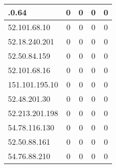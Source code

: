 \documentclass{article}
\begin{document}
\begin{longtable}{|>{\raggedright\arraybackslash}p{3cm}|c|c|c|c|}
    52.18.0.64 & 0 & 0 & 0 & 0 \\
    \hline
    
    
    \rowcolor{lightgreen} %
    
    52.101.68.10 & 0 & 0 & 0 & 0 \\
    \hline
    
    
    \rowcolor{lightgreen} %
    
    52.18.240.201 & 0 & 0 & 0 & 0 \\
    \hline
    
    
    \rowcolor{lightgreen} %
    
    52.50.84.159 & 0 & 0 & 0 & 0 \\
    \hline
    
    
    \rowcolor{lightgreen} %
    
    52.101.68.16 & 0 & 0 & 0 & 0 \\
    \hline
    
    
    \rowcolor{lightgreen} %
    
    151.101.195.10 & 0 & 0 & 0 & 0 \\
    \hline
    
    
    \rowcolor{lightgreen} %
    
    52.48.201.30 & 0 & 0 & 0 & 0 \\
    \hline
    
    
    \rowcolor{lightgreen} %
    
    52.213.201.198 & 0 & 0 & 0 & 0 \\
    \hline
    
    
    \rowcolor{lightgreen} %
    
    54.78.116.130 & 0 & 0 & 0 & 0 \\
    \hline
    
    
    \rowcolor{lightgreen} %
    
    52.50.88.161 & 0 & 0 & 0 & 0 \\
    \hline
    
    
    \rowcolor{lightgreen} %
    
    54.76.88.210 & 0 & 0 & 0 & 0 \\
    \hline
    

\end{longtable}
\end{document}

